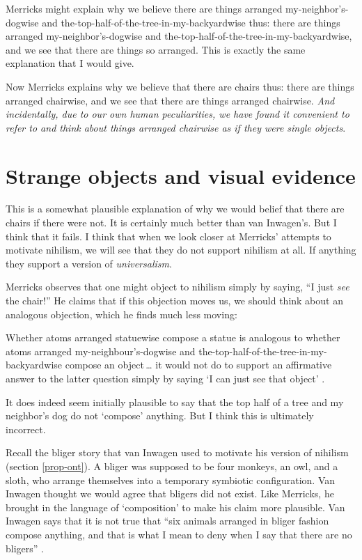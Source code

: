\documentclass[11pt]{article}
\newenvironment{squote}{%
\begin{spacing}{1}
       	\begin{list}{}{%
\setlength{\labelwidth}{0pt}%
\rightmargin\leftmargin%
}
\item\relax
}{%
\end{list}%
\end{spacing}
}
\begin{document}
\begin{spacing}{1.25}
Merricks might explain why we believe there are things arranged
my-neighbor's-dogwise and the-top-half-of-the-tree-in-my-backyardwise
thus: there are things arranged my-neighbor's-dogwise and
the-top-half-of-the-tree-in-my-backyardwise, and we see that there are
things so arranged.  This is exactly the same explanation that I would
give.

Now Merricks explains why we believe that there are chairs thus: there
are things arranged chairwise, and we see that there are things
arranged chairwise.  {\em And incidentally, due to our own human
  peculiarities, we have found it convenient to refer to and think
  about things arranged chairwise as if they were single objects}.

\section{Strange objects and visual evidence}
\label{dogbush}
This is a somewhat plausible explanation of why we would belief that
there are chairs if there were not.  It is certainly much better than
van Inwagen's.  But I think that it fails.  I think that when we look
closer at Merricks' attempts to motivate nihilism, we will see that
they do not support nihilism at all.  If anything they support a
version of {\em universalism}.

Merricks observes that one might object to nihilism simply by saying,
``I just {\em see} the chair!''  He claims that if this objection
moves us, we should think about an analogous objection, which he finds
much less moving:

\begin{squote}
Whether atoms arranged statuewise compose a statue is analogous to
whether atoms arranged my-neighbour's-dogwise and
the-top-half-of-the-tree-in-my-backyardwise compose an object\,\ldots
it would not do to support an affirmative answer to the latter
question simply by saying `I can just see that object'
\citeyearpar[73]{merricks2001a}.
\end{squote}

It does indeed seem initially plausible to say that the top half of a
tree and my neighbor's dog do not `compose' anything.  But I think
this is ultimately incorrect.

Recall the bliger story that van Inwagen used to motivate his version
of nihilism (section \ref{prop-ont}).  A bliger was supposed to be
four monkeys, an owl, and a sloth, who arrange themselves into a
temporary symbiotic configuration.  Van Inwagen thought we would agree
that bligers did not exist.  Like Merricks, he brought in the language
of `composition' to make his claim more plausible.  Van Inwagen says
that it is not true that ``six animals arranged in bliger fashion
compose anything, and that is what I mean to deny when I say that
there are no bligers'' \citeyearpar[104]{inwagen1995}.


\end{spacing}
\end{document}

